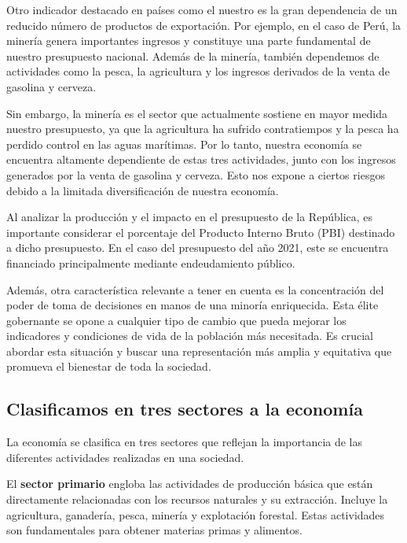 \documentclass[
  letterpaper,
  DIV=11,
  numbers=noendperiod]{scrartcl}
\begin{document}
Otro indicador destacado en países como el nuestro es la gran
dependencia de un reducido número de productos de exportación. Por
ejemplo, en el caso de Perú, la minería genera importantes ingresos y
constituye una parte fundamental de nuestro presupuesto nacional. Además
de la minería, también dependemos de actividades como la pesca, la
agricultura y los ingresos derivados de la venta de gasolina y cerveza.

Sin embargo, la minería es el sector que actualmente sostiene en mayor
medida nuestro presupuesto, ya que la agricultura ha sufrido
contratiempos y la pesca ha perdido control en las aguas marítimas. Por
lo tanto, nuestra economía se encuentra altamente dependiente de estas
tres actividades, junto con los ingresos generados por la venta de
gasolina y cerveza. Esto nos expone a ciertos riesgos debido a la
limitada diversificación de nuestra economía.

Al analizar la producción y el impacto en el presupuesto de la
República, es importante considerar el porcentaje del Producto Interno
Bruto (PBI) destinado a dicho presupuesto. En el caso del presupuesto
del año 2021, este se encuentra financiado principalmente mediante
endeudamiento público.

Además, otra característica relevante a tener en cuenta es la
concentración del poder de toma de decisiones en manos de una minoría
enriquecida. Esta élite gobernante se opone a cualquier tipo de cambio
que pueda mejorar los indicadores y condiciones de vida de la población
más necesitada. Es crucial abordar esta situación y buscar una
representación más amplia y equitativa que promueva el bienestar de toda
la sociedad.

\hypertarget{clasificamos-en-tres-sectores-a-la-economuxeda}{%
\subsection{Clasificamos en tres sectores a la
economía}\label{clasificamos-en-tres-sectores-a-la-economuxeda}}

La economía se clasifica en tres sectores que reflejan la importancia de
las diferentes actividades realizadas en una sociedad.

El \textbf{sector primario} engloba las actividades de producción básica
que están directamente relacionadas con los recursos naturales y su
extracción. Incluye la agricultura, ganadería, pesca, minería y
explotación forestal. Estas actividades son fundamentales para obtener
materias primas y alimentos.
\end{document}
